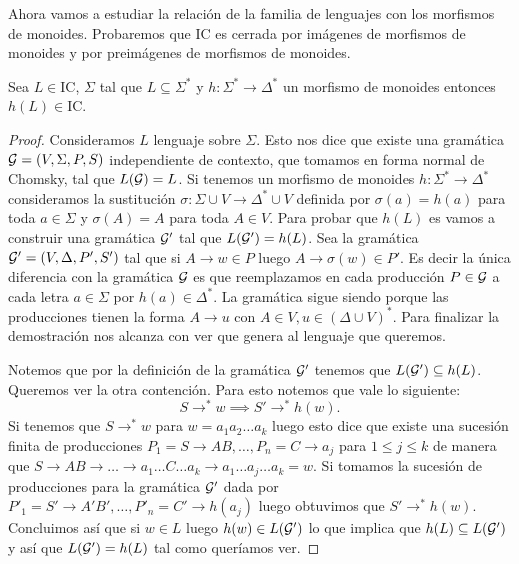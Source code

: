 \documentclass[tesis.tex]{subfiles}
\begin{document}
Ahora vamos a estudiar la relación de la familia de lenguajes \ic con los morfismos de monoides. 
Probaremos que IC es cerrada por imágenes de morfismos de monoides y por preimágenes de morfismos de monoides.
 

\begin{prop}\label{morfismos-monoides-ic}

		Sea $L \in \text{IC}$, $\Sigma$ tal que $L \subseteq \Sigma^{*}$ y $h:\Sigma^{*} \to \Delta^*$ un morfismo de monoides 
		 entonces $h(L) \in \text{IC}$.
		 
\end{prop}

\begin{proof}
		Consideramos $L$ lenguaje \ic sobre $\Sigma$.
		Esto nos dice que existe una gramática ${\cal G} = (V, \Sigma, P, S) $ independiente de contexto, que tomamos en forma normal de Chomsky, tal que $L({\cal G}) = L$. 
		Si tenemos un morfismo de monoides $h: \Sigma^* \to \Delta^*$ consideramos la sustitución $\sigma:\Sigma \cup V \to \Delta^* \cup V$ definida por $\sigma(a) = h(a)$ para toda $a \in \Sigma$ y $\sigma(A) = A$ para toda $A \in V$.		
		Para probar que $h(L)$ es \ic vamos a construir una gramática ${\cal G}'$ tal que $L({\cal G}') = h(L)$.
		Sea la gramática ${\cal G}'  = (V, \Delta, P', S')$ tal que si $A \to w \in P$ luego $A \to \sigma(w) \in P'$.
		Es decir la única diferencia con la gramática ${\cal G}$ es que reemplazamos en cada producción $P \in {\cal G}$ a cada letra $a \in \Sigma$ por $h(a) \in \Delta^*$.
		La gramática sigue siendo \ic porque las producciones tienen la forma $A \to u$ con $A \in V, u \in (\Delta \cup V)^*$.
		Para finalizar la demostración nos alcanza con ver que genera al lenguaje que queremos.

		Notemos que por la definición de la gramática ${\cal G}'$ tenemos que $L({\cal G}') \subseteq h(L)$. 
		Queremos ver la otra contención.		
		Para esto notemos que vale lo siguiente:
		\[
			S \to^* w \implies S' \to^{*} h(w).
		\]
		Si tenemos que $S \to^* w $  para $w = a_{1}a_{2} \dots a_{k}$ luego esto dice que existe una sucesión finita de producciones $P_{1} = S \to AB, \dots, P_{n} = C \to a_{j}$ para $ 1 \le j \le k$ de manera que 
		$S \to AB \to \dots \to a_{1}\dots C \dots a_{k} \to a_{1} \dots a_{j} \dots a_{k} = w$.
		Si tomamos la sucesión de producciones para la gramática ${\cal G}'$ dada por $P'_{1} = S' \to A'B', \dots, P'_{n} = C' \to h(a_{j})$ luego obtuvimos que $S' \to^* h(w)$.
		Concluimos así que si $w \in L$ luego $h(w) \in L({\cal G}')$ lo que implica que $h(L) \subseteq L({\cal G}')$ y así que $L({\cal G}') = h(L)$ tal como queríamos ver.
\end{proof}
\end{document}
